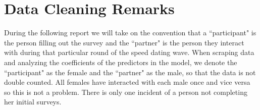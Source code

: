 \documentclass{article}
\begin{document}
\section{Data Cleaning Remarks}
\label{sec:dataclean}
During the following report we will take on the convention that a ``participant" is the person filling out the survey and the ``partner" is the person they interact with during that particular round of the speed dating wave.  When scraping data and analyzing the coefficients of the predictors in the model, we denote the ``participant" as the female and the ``partner" as the male, so that the data is not double counted.  All females have interacted with each male once and vice versa so this is not a problem.  There is only one incident of a person not completing her initial surveys.\\
\end{document}
